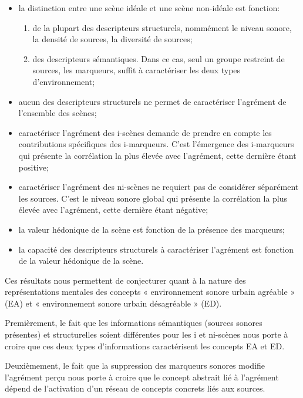 \begin{itemize}
\item la distinction entre une scène idéale et une scène non-idéale est fonction:

\begin{enumerate}
\item de la plupart des descripteurs structurels, nommément le niveau sonore, la densité de sources, la diversité de sources;
\item des descripteurs sémantiques. Dans ce cas, seul un groupe restreint de sources, les marqueurs, suffit à caractériser les deux types d'environnement;
\end{enumerate}
\item aucun des descripteurs structurels ne permet de caractériser l'agrément de l'ensemble des scènes;

\item caractériser l'agrément des i-scènes demande de prendre en compte les contributions spécifiques des i-marqueurs. C'est l'émergence des i-marqueurs qui présente la corrélation la plus élevée avec l'agrément, cette dernière étant positive;

\item caractériser l'agrément des ni-scènes ne requiert pas de considérer séparément les sources. C'est le niveau sonore global qui présente la corrélation la plus élevée avec l'agrément, cette dernière étant négative;

\item la valeur hédonique de la scène est fonction de la présence des marqueurs;

\item la capacité des descripteurs structurels à caractériser l'agrément est fonction de la valeur hédonique de la scène.
\end{itemize}

Ces résultats nous permettent de conjecturer quant à la nature des représentations mentales des concepts « environnement sonore urbain agréable » (EA) et « environnement sonore urbain désagréable » (ED). 

Premièrement, le fait que les informations sémantiques (sources sonores présentes) et structurelles soient différentes pour les i et ni-scènes nous porte à croire que ces deux types d'informations caractérisent les concepts EA et ED. 

Deuxièmement, le fait que la suppression des marqueurs sonores modifie l'agrément perçu nous porte à croire que le concept abstrait lié à l'agrément dépend de l'activation d'un réseau de concepts concrets liés aux sources.

